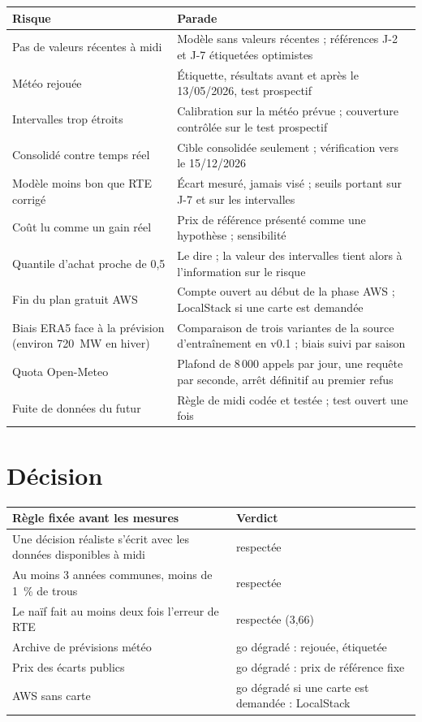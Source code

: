 \documentclass[11pt,a4paper]{article}
\begin{document}
\begin{table}[H]
\small
\begin{tabularx}{\linewidth}{lY}
\toprule
\textbf{Risque} & \textbf{Parade} \\
\midrule
Pas de valeurs récentes à midi & Modèle sans valeurs récentes ; références J-2 et J-7 étiquetées optimistes \\
Météo rejouée & Étiquette, résultats avant et après le 13/05/2026, test prospectif \\
Intervalles trop étroits & Calibration sur la météo prévue ; couverture contrôlée sur le test prospectif \\
Consolidé contre temps réel & Cible consolidée seulement ; vérification vers le 15/12/2026 \\
Modèle moins bon que RTE corrigé & Écart mesuré, jamais visé ; seuils portant sur J-7 et sur les intervalles \\
Coût lu comme un gain réel & Prix de référence présenté comme une hypothèse ; sensibilité \\
Quantile d'achat proche de 0,5 & Le dire ; la valeur des intervalles tient alors à l'information sur le risque \\
Fin du plan gratuit AWS & Compte ouvert au début de la phase AWS ; LocalStack si une carte est demandée \\
Biais ERA5 face à la prévision (environ 720~MW en hiver) & Comparaison de trois variantes de la source d'entraînement en v0.1 ; biais suivi par saison \\
Quota Open-Meteo & Plafond de 8\,000 appels par jour, une requête par seconde, arrêt définitif au premier refus \\
Fuite de données du futur & Règle de midi codée et testée ; test ouvert une fois \\
\bottomrule
\end{tabularx}
\end{table}

\section{Décision}

\begin{table}[H]
\small
\begin{tabularx}{\linewidth}{Yl}
\toprule
\textbf{Règle fixée avant les mesures} & \textbf{Verdict} \\
\midrule
Une décision réaliste s'écrit avec les données disponibles à midi & respectée \\
Au moins 3 années communes, moins de 1~\% de trous & respectée \\
Le naïf fait au moins deux fois l'erreur de RTE & respectée (3,66) \\
Archive de prévisions météo & go dégradé : rejouée, étiquetée \\
Prix des écarts publics & go dégradé : prix de référence fixe \\
AWS sans carte & go dégradé si une carte est demandée : LocalStack \\
\bottomrule
\end{tabularx}
\end{table}
\end{document}
